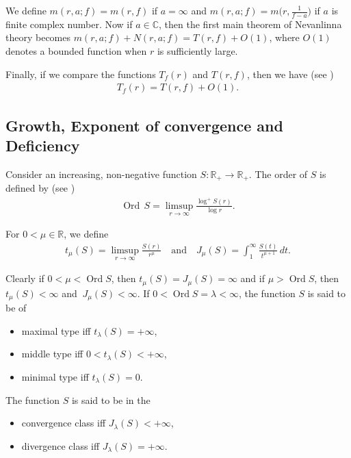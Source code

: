 \documentclass[11pt,reqno]{amsart}
\numberwithin{equation}{section}
\begin{document}
We define $m(r,a;f)=m(r,f)$ if $a=\infty$ and $m(r,a;f)=m\big(r,\frac{1}{f-a}\big)$ if $a$ is finite complex number. Now if $a\in\mathbb{C}$, then the first main theorem of Nevanlinna theory becomes $m(r,a;f)+N(r,a;f)=T(r,f) + O(1)$, where $O(1)$ denotes a bounded function when $r$ is sufficiently large.

Finally, if we compare the functions $T_f(r)$ and $T(r,f)$, then we have (see \cite[pp.19]{Hu-Li-Yang-2003})
\begin{align*}
T_f(r)=T(r,f)+O(1).
\end{align*}


\subsection*{Growth, Exponent of convergence and Deficiency}
Consider an increasing, non-negative function $S:\mathbb{R}_{+}\to\mathbb{R}_{+}.$
The order of $S$ is defined by (see \cite[pp. 28]{Stoll-1974})
\begin{align*}
\operatorname{Ord}\, S= \limsup_{r\to\infty}\frac{\log^{+} S(r)}{\log r}.
\end{align*}

For $0<\mu\in\mathbb{R}$, we define
\begin{align*}
t_{\mu}(S)=\limsup_{r\to\infty}\frac{S(r)}{r^{\mu}}\quad \text{and}\quad
J_{\mu}(S)=\int_{1}^{\infty}\frac{S(t)}{t^{\mu+1}}\,dt.
\end{align*}

Clearly if $0<\mu<\operatorname{Ord}S$, then $t_{\mu}(S)=J_{\mu}(S)=\infty$ and if $\mu>\operatorname{Ord}S$, then $t_{\mu}(S)<\infty$ and $\ J_{\mu}(S)<\infty$.
If $0<\operatorname{Ord}S=\lambda<\infty$, the function $S$ is said to be of
\begin{itemize}
	\item maximal type \quad iff \quad \(t_{\lambda}(S)=+\infty\),
	\item middle type \quad iff \quad \(0<t_{\lambda}(S)<+\infty\),
	\item minimal type \quad iff \quad \(t_{\lambda}(S)=0\).
\end{itemize}

The function $S$ is said to be in the
\begin{itemize}
	\item convergence class \quad iff \quad \(J_{\lambda}(S)<+\infty\),
	\item divergence class \quad iff \quad \(J_{\lambda}(S)=+\infty\).
\end{itemize}
\end{document}
